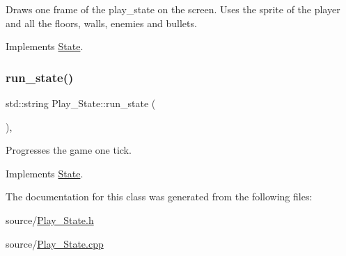 Draws one frame of the play\+\_\+state on the screen. Uses the sprite of the player and all the floors, walls, enemies and bullets. 

Implements \hyperlink{classState_a048a3b3ebeaf1c8a553040d42a61c48c}{State}.

\mbox{\label{classPlay__State_a209137246f75ba4bd2b5f9906d9317e6}} 
\subsubsection{\texorpdfstring{run\+\_\+state()}{run\_state()}}
{\footnotesize\ttfamily std\+::string Play\+\_\+\+State\+::run\+\_\+state (\begin{DoxyParamCaption}{ }\end{DoxyParamCaption})\hspace{0.3cm}{\ttfamily [override]}, {\ttfamily [virtual]}}

Progresses the game one tick. 

Implements \hyperlink{classState_a84fb17cf9f6a59c78e600b619670a0d9}{State}.



The documentation for this class was generated from the following files\+:\begin{DoxyCompactItemize}
\item 
source/\hyperlink{Play__State_8h}{Play\+\_\+\+State.\+h}\item 
source/\hyperlink{Play__State_8cpp}{Play\+\_\+\+State.\+cpp}\end{DoxyCompactItemize}
